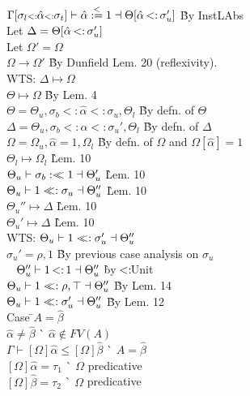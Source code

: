 \documentclass {article}
\newcommand{\st}{\ensuremath{\hspace{-1px}<:\hspace{-1px}}}
\newcommand{\alphahat}{\hat{\alpha}}
\newcommand{\betahat}{\hat{\beta}}
\newcommand{\instl}{\overset{<}{:=}}
\newcommand{\sigbndl}{:<\hspace{-5px}<}
\newcommand{\sigbndr}{<\hspace{-5px}<:}
\newcommand{\tst}{{\scriptstyle{<:}}}
\newcommand{\bound}[3]{#1 \tst #2 \tst #3}
\newcommand{\ctxmapto}{\longmapsto}
\begin{document}
\begin{tabbing}
\>$\Gamma[\bound{\sigma_l}{\alphahat}{\sigma_t}]\vdash \alphahat \instl 1 \dashv \Theta[\alphahat \st \sigma_u']$ \` By InstLAbs\\
\>Let $\Delta = \Theta[\alphahat \st \sigma_u']$\\
\>Let $\Omega' = \Omega$\\
\> $\Omega \longrightarrow \Omega'$ \` By Dunfield Lem. 20 (reflexivity).\\
\> WTS: $\Delta \ctxmapto \Omega$\\
\> $\Theta \ctxmapto \Omega$ \` By Lem. 4\\
\> $\Theta = \Theta_u,\bound{\sigma_b}{\alphahat}{\sigma_u},\Theta_l$ 	\` By defn. of $\Theta$\\
\> $\Delta = \Theta_u,\bound{\sigma_b}{\alphahat}{\sigma_u'},\Theta_l$ 	\` By defn. of $\Delta$\\
\> $\Omega = \Omega_u,\alphahat = 1,\Omega_l$							\` By defn. of $\Omega$ and $\Omega[\alphahat]=1$\\
\> $\Theta_l \ctxmapto \Omega_l$ 										\` Lem. 10\\
\> $\Theta_u \vdash \sigma_b \sigbndl 1 \dashv \Theta_u'$ 				\` Lem. 10\\
\> $\Theta_u \vdash 1 \sigbndr \sigma_u \dashv \Theta_u''$ 				\` Lem. 10\\
\> $\Theta_u''\ctxmapto\Delta$ 											\` Lem. 10\\
\> $\Theta_u'\ctxmapto\Delta$ 											\` Lem. 10\\
\> WTS: $\Theta_u \vdash 1 \sigbndr \sigma_u' \dashv \Theta_u''$\\
\> $\sigma_u' = \rho,1$ 												\` By previous case analysis on $\sigma_u$\\\
\> $\Theta_u'' \vdash 1 \st 1 \dashv \Theta_u''$ 						\` by $\st$Unit\\
\> $\Theta_u \vdash 1 \sigbndr \rho,\top \dashv\Theta_u''$				\` By Lem. 14\\
\> $\Theta_u \vdash 1 \sigbndr \sigma_u' \dashv \Theta_u''$ 			\` By Lem. 12\\
Case \=$A = \betahat$\\
\>$\alphahat \neq \betahat$ 											\` $\alphahat \not\in FV(A)$\\
\> $\Gamma \vdash [\Omega]\alphahat \leq [\Omega]\betahat$ 				\` $A = \betahat$\\
\> $[\Omega]\alphahat = \tau_1$ 										\` $\Omega$ predicative\\
\> $[\Omega]\betahat = \tau_2$ 											\` $\Omega$ predicative\\

\end{tabbing}
\end{document}
